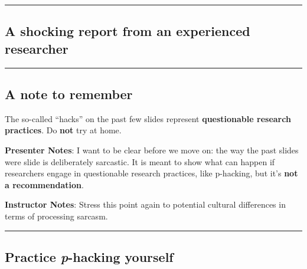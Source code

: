 \documentclass[
  english,
  letterpaper,
  DIV=11,
  numbers=noendperiod]{scrartcl}
\begin{document}
\begin{center}\rule{0.5\linewidth}{0.5pt}\end{center}

\subsection{A shocking report from an experienced
researcher}\label{a-shocking-report-from-an-experienced-researcher}

\begin{center}\rule{0.5\linewidth}{0.5pt}\end{center}

\subsection{A note to remember}\label{a-note-to-remember}

\begin{tcolorbox}[enhanced jigsaw, arc=.35mm, bottomrule=.15mm, bottomtitle=1mm, breakable, colback=white, colbacktitle=quarto-callout-warning-color!10!white, colframe=quarto-callout-warning-color-frame, coltitle=black, left=2mm, leftrule=.75mm, opacityback=0, opacitybacktitle=0.6, rightrule=.15mm, title=\textcolor{quarto-callout-warning-color}{\faExclamationTriangle}\hspace{0.5em}{Warning}, titlerule=0mm, toprule=.15mm, toptitle=1mm]

The so-called ``hacks'' on the past few slides represent
\textbf{questionable research practices}. Do \textbf{not} try at home.

\end{tcolorbox}

\textbf{Presenter Notes}: I want to be clear before we move on: the way
the past slides were slide is deliberately sarcastic. It is meant to
show what can happen if researchers engage in questionable research
practices, like p-hacking, but it's \textbf{not a recommendation}.

\textbf{Instructor Notes}: Stress this point again to potential cultural
differences in terms of processing sarcasm.

\begin{center}\rule{0.5\linewidth}{0.5pt}\end{center}

\subsection{\texorpdfstring{Practice \emph{p}-hacking
yourself}{Practice p-hacking yourself}}\label{practice-p-hacking-yourself}
\end{document}
